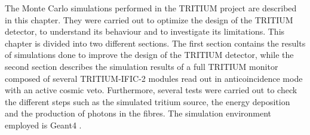 The Monte Carlo simulations performed in the TRITIUM project are described in this chapter. They were carried out to optimize the design of the TRITIUM detector, to understand its behaviour and to investigate its limitations. This chapter is divided into two different sections. The first section contains the results of simulations done to improve the design of the TRITIUM detector, while the second section describes the simulation results of a full TRITIUM monitor composed of several TRITIUM-IFIC-2 modules read out in anticoincidence mode with an active cosmic veto. Furthermore, several tests were carried out to check the different steps such as the simulated tritium source, the energy deposition and the production of photons in the fibres. The simulation environment employed is Geant4 \cite{Geant4WebPage, Geant4P}.
